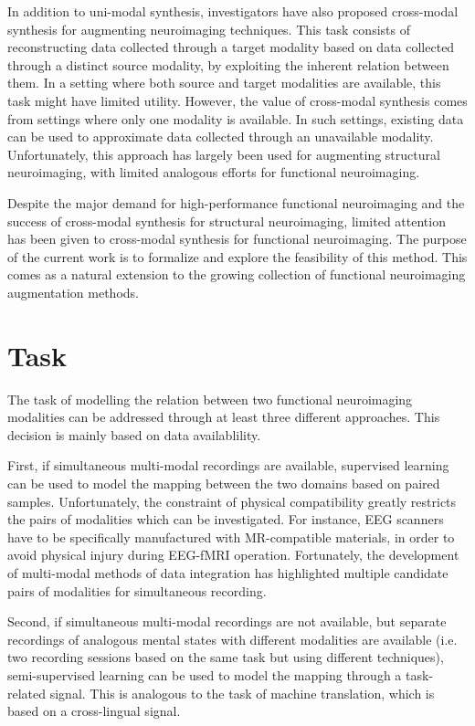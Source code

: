 \documentclass{article}
\begin{document}
In addition to uni-modal synthesis, investigators have also proposed cross-modal synthesis for augmenting neuroimaging techniques. This task consists of reconstructing data collected through a target modality based on data collected through a distinct source modality, by exploiting the inherent relation between them. In a setting where both source and target modalities are available, this task might have limited utility. However, the value of cross-modal synthesis comes from settings where only one modality is available. In such settings, existing data can be used to approximate data collected through an unavailable modality. Unfortunately, this approach has largely been used for augmenting structural neuroimaging, with limited analogous efforts for functional neuroimaging.

Despite the major demand for high-performance functional neuroimaging and the success of cross-modal synthesis for structural neuroimaging, limited attention has been given to cross-modal synthesis for functional neuroimaging. The purpose of the current work is to formalize and explore the feasibility of this method. This comes as a natural extension to the growing collection of functional neuroimaging augmentation methods.

\section{Task}

The task of modelling the relation between two functional neuroimaging modalities can be addressed through at least three different approaches. This decision is mainly based on data availablility.

First, if simultaneous multi-modal recordings are available, supervised learning can be used to model the mapping between the two domains based on paired samples. Unfortunately, the constraint of physical compatibility greatly restricts the pairs of modalities which can be investigated. For instance, EEG scanners have to be specifically manufactured with MR-compatible materials, in order to avoid physical injury during EEG-fMRI operation. Fortunately, the development of multi-modal methods of data integration has highlighted multiple candidate pairs of modalities for simultaneous recording.

Second, if simultaneous multi-modal recordings are not available, but separate recordings of analogous mental states with different modalities are available (i.e. two recording sessions based on the same task but using different techniques), semi-supervised learning can be used to model the mapping through a task-related signal. This is analogous to the task of machine translation, which is based on a cross-lingual signal.
\end{document}
